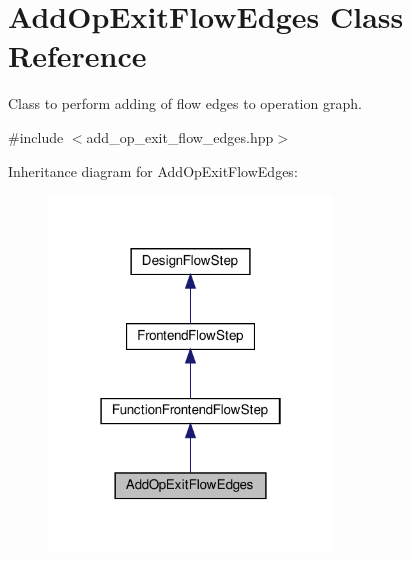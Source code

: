 \hypertarget{classAddOpExitFlowEdges}{}\section{Add\+Op\+Exit\+Flow\+Edges Class Reference}
\label{classAddOpExitFlowEdges}


Class to perform adding of flow edges to operation graph.  




{\ttfamily \#include $<$add\+\_\+op\+\_\+exit\+\_\+flow\+\_\+edges.\+hpp$>$}



Inheritance diagram for Add\+Op\+Exit\+Flow\+Edges\+:
\nopagebreak
\begin{figure}[H]
\begin{center}
\leavevmode
\includegraphics[width=214pt]{da/dbd/classAddOpExitFlowEdges__inherit__graph}
\end{center}
\end{figure}


